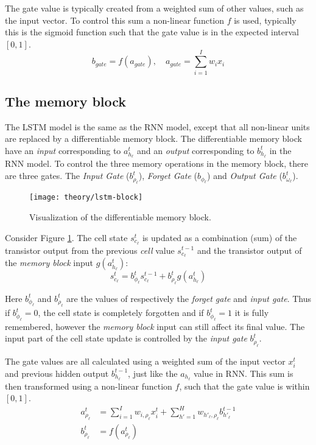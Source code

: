 The gate value is typically created from a weighted sum of other values, such as the input vector. To control this sum a non-linear function $f$ is used, typically this is the sigmoid function such that the gate value is in the expected interval $[0, 1]$.
\begin{equation}
b_{gate} = f(a_{gate}), \quad a_{gate} = \sum_{i=1}^I w_i x_i
\end{equation}

\subsection{The memory block}

The LSTM model is the same as the RNN model, except that all non-linear units are replaced by a differentiable memory block. The differentiable memory block have an \textit{input} corresponding to $a_{h_\ell}^t$ and an \textit{output} corresponding to $b_{h_\ell}^t$ in the RNN model. To control the three memory operations in the memory block, there are three gates. The \textit{Input Gate} ($b_{\rho_\ell}^t$), \textit{Forget Gate} ($b_{\phi_\ell}$) and \textit{Output Gate} ($b_{\omega_\ell}^t$).

\begin{figure}[h]
	\centering
	\texttt{[image: theory/lstm-block]}
	\caption{Visualization of the differentiable memory block.}
	\label{fig:theory:lstm:lstm-block}
\end{figure}

Consider Figure \ref{fig:theory:lstm:lstm-block}. The cell state $s_{c_\ell}^t$ is updated as a combination (sum) of the transistor output from the previous \textit{cell} value $s_{c_\ell}^{t-1}$ and the transistor output of the \textit{memory block} input $g(a_{h_\ell}^t)$:
\begin{equation}
s_{c_\ell}^t = b_{\phi_\ell}^t s_{c_\ell}^{t-1} + b_{\rho_\ell}^t g(a_{h_\ell}^t)
\end{equation}

Here $b_{\phi_\ell}^t$ and $b_{\rho_\ell}^t$ are the values of respectively the \textit{forget gate} and \textit{input gate}. Thus if $b_{\phi_\ell}^t = 0$, the cell state is completely forgotten and if $b_{\phi_\ell}^t = 1$ it is fully remembered, however the \textit{memory block} input can still affect its final value. The input part of the cell state update is controlled by the \textit{input gate} $b_{\rho_\ell}^t$. 

The gate values are all calculated using a weighted sum of the input vector $x_i^t$ and previous hidden output $b_{h_\ell}^{t-1}$, just like the $a_{h_\ell}$ value in RNN. This sum is then transformed using a non-linear function $f$, such that the gate value is within $[0, 1]$.
\begin{equation}
\begin{aligned}
a_{\rho_\ell}^t &= \sum_{i=1}^I w_{i, \rho_\ell} x_i^t + \sum_{h'=1}^H w_{h'_\ell, \rho_\ell} b_{h'_\ell}^{t-1} \\
b_{\rho_\ell}^t &= f(a_{\rho_\ell}^t)
\end{aligned}
\label{eq:theory:lstm:gate-value-example}
\end{equation}


